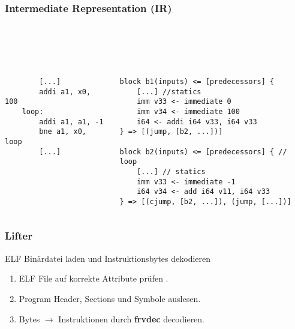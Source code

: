 \begin{frame}[fragile]
    \frametitle{Intermediate Representation (IR)}
    ~\\
    ~\\
    ~\\
    \begin{columns}[c]
        \begin{lstlisting}
        [...]
        addi a1, x0, 100
    loop:
        addi a1, a1, -1
        bne a1, x0, loop
        [...]
        \end{lstlisting}


        \begin{lstlisting}
block b1(inputs) <= [predecessors] {
    [...] //statics
    imm v33 <- immediate 0
    imm v34 <- immediate 100
    i64 <- addi i64 v33, i64 v33
} => [(jump, [b2, ...])]

block b2(inputs) <= [predecessors] { // loop
    [...] // statics
    imm v33 <- immediate -1
    i64 v34 <- add i64 v11, i64 v33
} => [(cjump, [b2, ...]), (jump, [...])]
    \end{lstlisting}
    \end{columns}

\end{frame}
\clearpage


\begin{frame}
    \frametitle{Lifter}{ELF Binärdatei laden und Instruktionsbytes dekodieren}

    \begin{enumerate}
        \item ELF File auf korrekte Attribute prüfen .
        \item Program Header, Sections und Symbole auslesen.
        \item Bytes $\rightarrow$ Instruktionen durch \textbf{frvdec} decodieren.
    \end{enumerate}
\end{frame}
\clearpage

